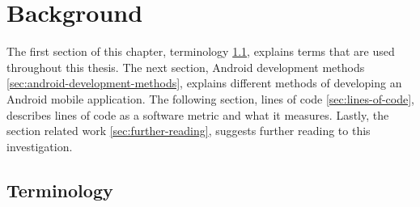 \chapter{Background}\label{ch:background}
The first section of this chapter, terminology \ref{sec:terminology}, explains terms that are used throughout this thesis. The next section, Android development methods \ref{sec:android-development-methods}, explains different methods of developing an Android mobile application. The following section, lines of code \ref{sec:lines-of-code}, describes lines of code as a software metric and what it measures. Lastly, the section related work \ref{sec:further-reading}, suggests further reading to this investigation. 

\section{Terminology}\label{sec:terminology}

